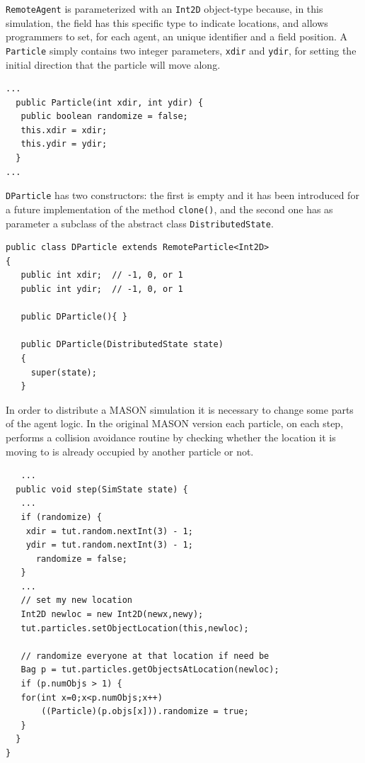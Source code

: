 \documentclass{book}
\begin{document}
\texttt{RemoteAgent} is parameterized with an \texttt{Int2D} object-type because, in this simulation, the field has this specific type to indicate locations, and allows programmers to set, for each agent, an unique identifier and a field position.
A \texttt{Particle} simply contains two integer parameters, \texttt{xdir} and \texttt{ydir}, for setting the initial direction that the particle will move along.

\begin{lstlisting}
...
  public Particle(int xdir, int ydir) {
   public boolean randomize = false;
   this.xdir = xdir;
   this.ydir = ydir;
  }
...
\end{lstlisting}


\texttt{DParticle} has two constructors: the first is empty and it has been introduced for a future implementation of the method \texttt{clone()}, and the second one has as parameter a subclass of the abstract class \texttt{DistributedState}.

\begin{lstlisting}
public class DParticle extends RemoteParticle<Int2D>
{
   public int xdir;  // -1, 0, or 1
   public int ydir;  // -1, 0, or 1

   public DParticle(){ }
   
   public DParticle(DistributedState state)
   {
     super(state);
   }
\end{lstlisting}

In order to distribute a MASON simulation it is necessary to change some parts of the agent logic. In the original MASON version each particle, on each step, performs a collision avoidance routine by checking whether the location it is moving to is already occupied by another particle or not. 

\begin{lstlisting}
   ...
  public void step(SimState state) {
   ...
   if (randomize) {
    xdir = tut.random.nextInt(3) - 1;
    ydir = tut.random.nextInt(3) - 1;
	  randomize = false;
   }
   ...
   // set my new location
   Int2D newloc = new Int2D(newx,newy);
   tut.particles.setObjectLocation(this,newloc);
   
   // randomize everyone at that location if need be
   Bag p = tut.particles.getObjectsAtLocation(newloc);
   if (p.numObjs > 1) {
   for(int x=0;x<p.numObjs;x++)
       ((Particle)(p.objs[x])).randomize = true;
   }
  }
}
\end{lstlisting}
\end{document}
